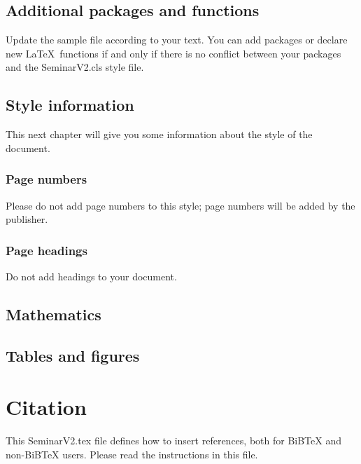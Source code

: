 \documentclass{SeminarV2}
\begin{document}
\subsection{Additional packages and functions}
Update the sample file according to your text. You can add
packages or declare new \LaTeX\ functions if and only if there is no conflict between your packages and the SeminarV2.cls style file.

\subsection{Style information}
This next chapter will give you some information about the style of the document.
\subsubsection{Page numbers}
Please do not add page numbers to this style; page numbers will be added by the publisher.

\subsubsection{Page headings}
Do not add headings to your document.

\subsection{Mathematics}


\subsection{Tables and figures}


\section{Citation}
This SeminarV2.tex file defines how to insert references, both for
BiBTeX and non-BiBTeX users.  Please read the instructions in this
file.

\end{document}
